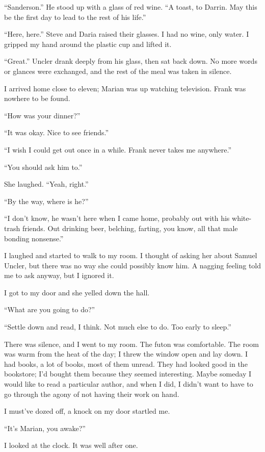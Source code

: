 \documentclass[
]{article}
\begin{document}
``Sanderson.'' He stood up with a glass of red wine. ``A toast, to
Darrin. May this be the first day to lead to the rest of his life.''

``Here, here.'' Steve and Daria raised their glasses. I had no wine,
only water. I gripped my hand around the plastic cup and lifted it.

``Great.'' Uncler drank deeply from his glass, then sat back down. No
more words or glances were exchanged, and the rest of the meal was taken
in silence.

I arrived home close to eleven; Marian was up watching television. Frank
was nowhere to be found.

``How was your dinner?''

``It was okay. Nice to see friends.''

``I wish I could get out once in a while. Frank never takes me
anywhere.''

``You should ask him to.''

She laughed. ``Yeah, right.''

``By the way, where is he?''

``I don't know, he wasn't here when I came home, probably out with his
white-trash friends. Out drinking beer, belching, farting, you know, all
that male bonding nonsense.''

I laughed and started to walk to my room. I thought of asking her about
Samuel Uncler, but there was no way she could possibly know him. A
nagging feeling told me to ask anyway, but I ignored it.

I got to my door and she yelled down the hall.

``What are you going to do?''

``Settle down and read, I think. Not much else to do. Too early to
sleep.''

There was silence, and I went to my room. The futon was comfortable. The
room was warm from the heat of the day; I threw the window open and lay
down. I had books, a lot of books, most of them unread. They had looked
good in the bookstore; I'd bought them because they seemed interesting.
Maybe someday I would like to read a particular author, and when I did,
I didn't want to have to go through the agony of not having their work
on hand.

I must've dozed off, a knock on my door startled me.

``It's Marian, you awake?''

I looked at the clock. It was well after one.
\end{document}
